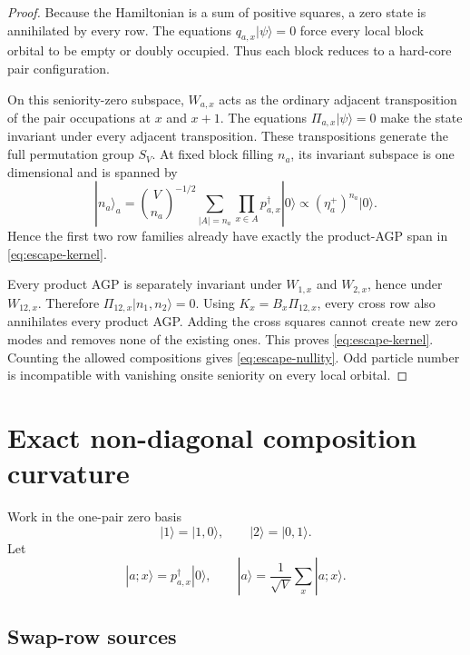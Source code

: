 \documentclass[11pt]{article}
\theoremstyle{remark}
\begin{document}
\begin{proof}
Because the Hamiltonian is a sum of positive squares, a zero state is
annihilated by every row.  The equations $q_{a,x}|\psi\rangle=0$ force every
local block orbital to be empty or doubly occupied.  Thus each block reduces
to a hard-core pair configuration.

On this seniority-zero subspace, $W_{a,x}$ acts as the ordinary adjacent
transposition of the pair occupations at $x$ and $x+1$.  The equations
$\Pi_{a,x}|\psi\rangle=0$ make the state invariant under every adjacent
transposition.  These transpositions generate the full permutation group
$S_V$.  At fixed block filling $n_a$, its invariant subspace is one
dimensional and is spanned by
\begin{equation}
 |n_a\rangle_a
 =\binom V{n_a}^{-1/2}
 \sum_{|A|=n_a}\prod_{x\in A}p_{a,x}^\dagger|0\rangle
 \propto(\eta_a^+)^{n_a}|0\rangle.
 \label{eq:dicke-agp}
\end{equation}
Hence the first two row families already have exactly the product-AGP span in
\eqref{eq:escape-kernel}.

Every product AGP is separately invariant under $W_{1,x}$ and $W_{2,x}$,
hence under $W_{12,x}$.  Therefore
$\Pi_{12,x}|n_1,n_2\rangle=0$.  Using
$K_x=B_x\Pi_{12,x}$, every cross row also annihilates every product AGP.
Adding the cross squares cannot create new zero modes and removes none of the
existing ones.  This proves \eqref{eq:escape-kernel}.  Counting the allowed
compositions gives \eqref{eq:escape-nullity}.  Odd particle number is
incompatible with vanishing onsite seniority on every local orbital.
\end{proof}

\section{Exact non-diagonal composition curvature}

Work in the one-pair zero basis
\begin{equation}
 |1\rangle=|1,0\rangle,
 \qquad
 |2\rangle=|0,1\rangle.
 \label{eq:onepair-basis}
\end{equation}
Let
\begin{equation}
 |a;x\rangle=p_{a,x}^\dagger|0\rangle,
 \qquad
 |a\rangle=\frac1{\sqrt V}\sum_x|a;x\rangle.
\end{equation}

\subsection{Swap-row sources}
\end{document}

